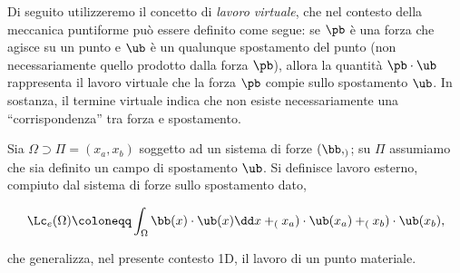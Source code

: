 


Di seguito utilizzeremo il concetto di \textit{lavoro virtuale}, che nel contesto della meccanica puntiforme può essere definito come segue: se $\pb$ è una forza che agisce su un punto e $\ub$ è un qualunque spostamento del punto (non necessariamente quello prodotto dalla forza $\pb$), allora la quantità $\pb \cdot \ub$ rappresenta il lavoro virtuale che la forza $\pb$ compie sullo spostamento $\ub$. In sostanza, il termine virtuale indica che non esiste necessariamente una ``corrispondenza'' tra forza e spostamento.

Sia  $\Omega\supset\Pi=(x_a, x_b)$ soggetto ad un sistema di forze $(\bb, \sb)$; su $\Pi$ assumiamo che sia definito un campo di spostamento $\ub$. Si definisce lavoro esterno, compiuto dal sistema di forze sullo spostamento dato, 
\begin{definition}
	\begin{equation}\label{Le1}
\Lc_e(\Omega)\coloneqq\int_{\Omega}\bb(x)\cdot \ub(x)\dd x+\sb(x_a)\cdot\ub(x_a)+\sb(x_b)\cdot\ub(x_b),
\end{equation}
\end{definition}
che generalizza, nel presente contesto 1D, il lavoro di un punto materiale.


